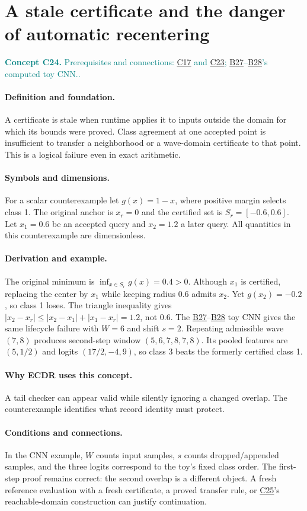 \documentclass[11pt,a4paper]{article}
\newcommand{\abs}[1]{\left\lvert#1\right\rvert}
\newcommand{\conceptid}{Front matter}
\newcommand{\concept}[3]{\clearpage\renewcommand{\conceptid}{#1}%
\section{#2}\label{concept:#1}%
\textcolor{teal}{\textbf{Concept #1.} Prerequisites and connections: #3.}\par
\typeout{ECDR-CONCEPT-START #1 PAGE=\thepage}}
\begin{document}
\concept{C24}{A stale certificate and the danger of automatic recentering}{\hyperref[concept:C17]{C17} and \hyperref[concept:C23]{C23}; \hyperref[concept:B27]{B27}--\hyperref[concept:B28]{B28}'s computed toy CNN.}
\paragraph{Definition and foundation.}
A certificate is stale when runtime applies it to inputs outside the domain for which its bounds were proved. Class agreement at one accepted point is insufficient to transfer a neighborhood or a wave-domain certificate to that point. This is a logical failure even in exact arithmetic.
\paragraph{Symbols and dimensions.}
For a scalar counterexample let $g(x)=1-x$, where positive margin selects class 1. The original anchor is $x_r=0$ and the certified set is $S_r=[-0.6,0.6]$. Let $x_1=0.6$ be an accepted query and $x_2=1.2$ a later query. All quantities in this counterexample are dimensionless.
\paragraph{Derivation and example.}
The original minimum is $\inf_{x\in S_r}g(x)=0.4>0$. Although $x_1$ is certified, replacing the center by $x_1$ while keeping radius 0.6 admits $x_2$. Yet $g(x_2)=-0.2$, so class 1 loses. The triangle inequality gives $\abs{x_2-x_r}\le\abs{x_2-x_1}+\abs{x_1-x_r}=1.2$, not 0.6.
The \hyperref[concept:B27]{B27}--\hyperref[concept:B28]{B28} toy CNN gives the same lifecycle failure with $W=6$ and shift $s=2$. Repeating admissible wave $(7,8)$ produces second-step window $(5,6,7,8,7,8)$. Its pooled features are $(5,1/2)$ and logits $(17/2,-4,9)$, so class 3 beats the formerly certified class 1.
\paragraph{Why ECDR uses this concept.}
A tail checker can appear valid while silently ignoring a changed overlap. The counterexample identifies what record identity must protect.
\paragraph{Conditions and connections.}
In the CNN example, $W$ counts input samples, $s$ counts dropped/appended samples, and the three logits correspond to the toy's fixed class order. The first-step proof remains correct: the second overlap is a different object. A fresh reference evaluation with a fresh certificate, a proved transfer rule, or \hyperref[concept:C25]{C25}'s reachable-domain construction can justify continuation.
\par\label{endconcept:C24}
\end{document}
